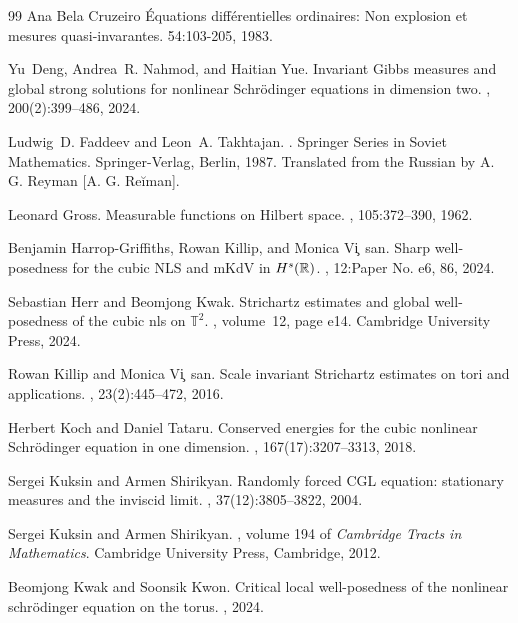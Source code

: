 \documentclass[11pt,leqno]{amsart}
\begin{document}
\begin{thebibliography}{99}
Ana Bela Cruzeiro
\newblock  \'Equations diff\'erentielles ordinaires: Non explosion et mesures quasi-invarantes.
 54:103-205, 1983.

Yu~Deng, Andrea~R. Nahmod, and Haitian Yue.
\newblock Invariant {G}ibbs measures and global strong solutions for nonlinear
  {S}chr\"odinger equations in dimension two.
, 200(2):399--486, 2024.

Ludwig~D. Faddeev and Leon~A. Takhtajan.
.
\newblock Springer Series in Soviet Mathematics. Springer-Verlag, Berlin, 1987.
\newblock Translated from the Russian by A. G. Reyman [A. G. Re\u iman].

Leonard Gross.
\newblock Measurable functions on {H}ilbert space.
, 105:372--390, 1962.

Benjamin Harrop-Griffiths, Rowan Killip, and Monica Vi\c~san.
\newblock Sharp well-posedness for the cubic {NLS} and m{K}d{V} in {$H^s(\Bbb
  R)$}.
, 12:Paper No. e6, 86, 2024.

Sebastian Herr and Beomjong Kwak.
\newblock Strichartz estimates and global well-posedness of the cubic nls on ${\mathbb T}^2$. 
, volume~12, page e14. Cambridge
  University Press, 2024.

Rowan Killip and Monica Vi\c~san.
\newblock Scale invariant {S}trichartz estimates on tori and applications.
, 23(2):445--472, 2016.

Herbert Koch and Daniel Tataru.
\newblock Conserved energies for the cubic nonlinear {S}chr\"odinger equation
  in one dimension.
, 167(17):3207--3313, 2018.

Sergei Kuksin and Armen Shirikyan.
\newblock Randomly forced {CGL} equation: stationary measures and the inviscid
  limit.
, 37(12):3805--3822, 2004.

Sergei Kuksin and Armen Shirikyan.
, volume 194 of {\em
  Cambridge Tracts in Mathematics}.
\newblock Cambridge University Press, Cambridge, 2012.

Beomjong Kwak and Soonsik Kwon.
\newblock Critical local well-posedness of the nonlinear schr{\"o}dinger
  equation on the torus.
, 2024.


\end{thebibliography}
\end{document}
